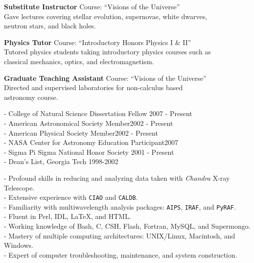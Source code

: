 \documentclass[11pt]{cv}
\begin{document}
\begin{llist}

{\sc \bf{Substitute Instructor}}
Course: ``Visions of the Universe''\\
Gave lectures covering stellar evolution, supernovae, white dwarves,\\
neutron stars, and black holes.

{\sc \bf{Physics Tutor}}
Course: ``Introductory Honors Physics I \& II''\\
Tutored physics students taking introductory physics courses such as\\
classical mechanics, optics, and electromagnetism.

{\sc \bf{Graduate Teaching Assistant}}
Course: ``Visions of the Universe''\\
Directed and supervised laboratories for non-calculus based\\
astronomy course.


- College of Natural Science Dissertation Fellow \hfill 2007 - Present\\
- American Astronomical Society Member\hfill 2002 - Present\\
- American Physical Society Member\hfill 2002 - Present\\
- NASA Center for Astronomy Education Participant\hfill 2007\\
- Sigma Pi Sigma National Honor Society \hfill 2001 - Present\\
- Dean's List, Georgia Tech \hfill 1998-2002


- Profound skills in reducing and analyzing data taken with {\textit{Chandra}} X-ray Telescope.\\
- Extensive experience with {\tt{CIAO}} and {\tt{CALDB}}.\\
- Familiarity with multiwavelength analysis packages: {\tt{AIPS}}, {\tt{IRAF}}, and {\tt{PyRAF}}.\\
- Fluent in Perl, IDL, LaTeX, and HTML.\\
- Working knowledge of Bash, C, CSH, Flash, Fortran, MySQL, and Supermongo.\\
- Mastery of multiple computing architectures: UNIX/Linux, Macintosh, and Windows.\\
- Expert of computer troubleshooting, maintenance, and system construction.


\end{llist}
\end{document}
